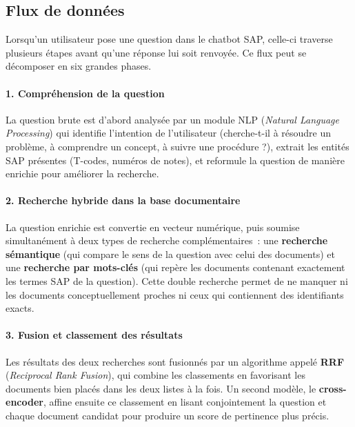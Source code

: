 




\subsection{Flux de données}
 
Lorsqu'un utilisateur pose une question dans le chatbot SAP, celle-ci traverse plusieurs étapes avant qu'une réponse lui soit renvoyée. Ce flux peut se décomposer en six grandes phases.

\paragraph{1. Compréhension de la question}
La question brute est d'abord analysée par un module NLP (\textit{Natural Language Processing}) qui identifie l'intention de l'utilisateur (cherche-t-il à résoudre un problème, à comprendre un concept, à suivre une procédure ?), extrait les entités SAP présentes (T-codes, numéros de notes), et reformule la question de manière enrichie pour améliorer la recherche.

\paragraph{2. Recherche hybride dans la base documentaire}
La question enrichie est convertie en vecteur numérique, puis soumise simultanément à deux types de recherche complémentaires~: une \textbf{recherche sémantique} (qui compare le sens de la question avec celui des documents) et une \textbf{recherche par mots-clés} (qui repère les documents contenant exactement les termes SAP de la question). Cette double recherche permet de ne manquer ni les documents conceptuellement proches ni ceux qui contiennent des identifiants exacts.

\paragraph{3. Fusion et classement des résultats}
Les résultats des deux recherches sont fusionnés par un algorithme appelé \textbf{RRF} (\textit{Reciprocal Rank Fusion}), qui combine les classements en favorisant les documents bien placés dans les deux listes à la fois. Un second modèle, le \textbf{cross-encoder}, affine ensuite ce classement en lisant conjointement la question et chaque document candidat pour produire un score de pertinence plus précis.

